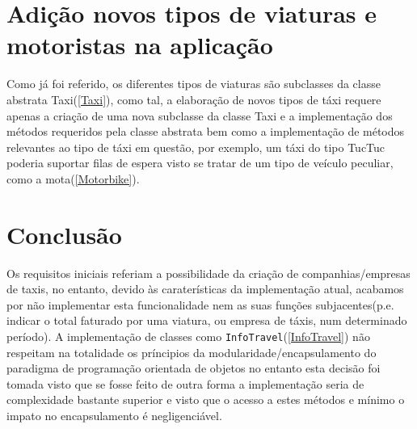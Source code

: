 \documentclass[a4paper,10pt,portuguese]{article}
\begin{document}
\section{Adição novos tipos de viaturas e motoristas na aplicação}
Como já foi referido, os diferentes tipos de viaturas são subclasses da classe abstrata Taxi(\ref{Taxi}), como tal, a elaboração de novos tipos de táxi requere apenas a criação de uma nova subclasse da classe Taxi e a implementação dos métodos requeridos pela classe abstrata bem como a implementação de métodos relevantes ao tipo de táxi em questão, por exemplo, um táxi do tipo TucTuc poderia suportar filas de espera visto se tratar de um tipo de veículo peculiar, como a mota(\ref{Motorbike}).

\newpage

\section{Conclusão}
Os requisitos iniciais referiam a possibilidade da criação de companhias/empresas de taxis, no entanto, devido às caraterísticas da implementação atual, acabamos por não implementar esta funcionalidade nem as suas funções subjacentes(p.e. indicar o total faturado por uma viatura, ou empresa de táxis, num determinado período). A implementação de classes como \texttt{InfoTravel}(\ref{InfoTravel}) não respeitam na totalidade os príncipios da modularidade/encapsulamento do paradigma de programação orientada de objetos no entanto esta decisão foi tomada visto que se fosse feito de outra forma a implementação seria de complexidade bastante superior e visto que o acesso a estes métodos e mínimo o impato no encapsulamento é negligenciável.
\end{document}
